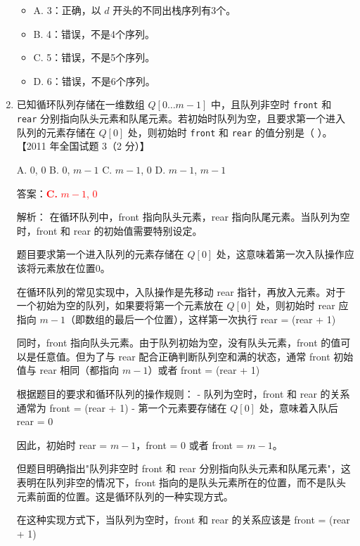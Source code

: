 \documentclass[lang=cn,newtx,10pt,scheme=chinese]{../../../elegantbook}
\begin{document}
\begin{enumerate}
    \begin{itemize}
        \item A. 3：正确，以 $d$ 开头的不同出栈序列有3个。
        \item B. 4：错误，不是4个序列。
        \item C. 5：错误，不是5个序列。
        \item D. 6：错误，不是6个序列。
    \end{itemize}

    \item 已知循环队列存储在一维数组 $Q[0 \ldots m-1]$ 中，且队列非空时 \texttt{front} 和 \texttt{rear} 分别指向队头元素和队尾元素。若初始时队列为空，且要求第一个进入队列的元素存储在 $Q[0]$ 处，则初始时 \texttt{front} 和 \texttt{rear} 的值分别是（ ）。  
    【2011 年全国试题 3（2 分）】  

    A. 0, 0 \quad B. 0, $m-1$ \quad C. $m-1$, 0 \quad D. $m-1$, $m-1$  

    答案：\textcolor{red}{\textbf{C.} $m-1$, 0}

    解析：
    在循环队列中，front 指向队头元素，rear 指向队尾元素。当队列为空时，front 和 rear 的初始值需要特别设定。

    题目要求第一个进入队列的元素存储在 $Q[0]$ 处，这意味着第一次入队操作应该将元素放在位置0。

    在循环队列的常见实现中，入队操作是先移动 rear 指针，再放入元素。对于一个初始为空的队列，如果要将第一个元素放在 $Q[0]$ 处，则初始时 rear 应指向 $m-1$（即数组的最后一个位置），这样第一次执行 rear = (rear + 1) %

    同时，front 指向队头元素。由于队列初始为空，没有队头元素，front 的值可以是任意值。但为了与 rear 配合正确判断队列空和满的状态，通常 front 初始值与 rear 相同（都指向 $m-1$）或者 front = (rear + 1) %

    根据题目的要求和循环队列的操作规则：
    - 队列为空时，front 和 rear 的关系通常为 front = (rear + 1) %
    - 第一个元素要存储在 $Q[0]$ 处，意味着入队后 rear = 0
    
    因此，初始时 rear = $m-1$，front = 0 或者 front = $m-1$。

    但题目明确指出"队列非空时 front 和 rear 分别指向队头元素和队尾元素"，这表明在队列非空的情况下，front 指向的是队头元素所在的位置，而不是队头元素前面的位置。这是循环队列的一种实现方式。
    
    在这种实现方式下，当队列为空时，front 和 rear 的关系应该是 front = (rear + 1) %


\end{enumerate}
\end{document}
